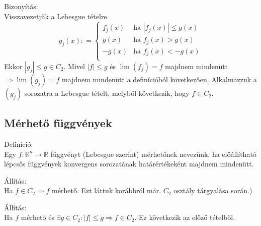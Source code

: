 \documentclass[12pt,a4paper]{scrartcl}
\newenvironment{definicio}{}{}
\newenvironment{bizonyitas}{}{}
\newenvironment{allitas}{}{}
\begin{document}
\begin{bizonyitas}

Bizonyítás:\\
Visszavezetjük a Lebesgue tételre.
\[g_{j}\left( x \right): = \left\{ \begin{matrix}
{f_{j}\left( x \right)} & {\text{ha~}\left| {f_{j}\left( x \right)} \right| \leq g\left( x \right)} \\
{g\left( x \right)} & {\text{ha~}f_{j}\left( x \right) > g\left( x \right)} \\
{- g\left( x \right)} & {\text{ha~}f_{j}\left( x \right) < - g\left( x \right)} \\
\end{matrix} \right.\] Ekkor \(\left| g_{j} \right| \leq g \in C_{2}\).
Mivel \(\left| f \right| \leq g\) és \(\lim\left( f_{j} \right) = f\)
majdnem mindenütt
\(\left. \Rightarrow\lim\left( g_{j} \right) = f \right.\) majdnem
mindenütt a definícióból következően. Alkalmazzuk a
\(\left( g_{j} \right)\) sorozatra a Lebesgue tételt, melyből
következik, hogy \(f \in C_{2}\).

\end{bizonyitas}

\hypertarget{merheto-fuggvenyek}{%
\subsection{Mérhető függvények}\label{merheto-fuggvenyek}}

\begin{definicio}

Definíció:\\
Egy \(\left. f:{\mathbb{R}}^{n}\rightarrow{\mathbb{R}} \right.\)
függvényt (Lebesgue szerint) mérhetőnek nevezünk, ha előállítható
lépcsős függvények konvergens sorozatának határértékeként majdnem
mindenütt.

\end{definicio}

\begin{allitas}

Állítás:\\
Ha \(\left. f \in C_{2}\Rightarrow f \right.\) mérhető. Ezt láttuk
korábbról már. \(C_{2}\) osztály tárgyalása során.)

\end{allitas}

\begin{allitas}

Állítás:\\
Ha \(f\) mérhető és
\(\left. \exists g \in C_{2}:\left| f \right| \leq g\Rightarrow f \in C_{2} \right.\).
Ez következik az előző tételből.

\end{allitas}
\end{document}
